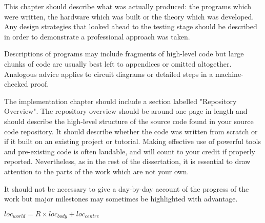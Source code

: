 \documentclass[runningheads]{llncs}
\begin{document}
This chapter should describe what was actually produced: the programs which were written, the hardware which was built or the theory which was developed. Any design strategies that looked ahead to the testing stage should be described in order to demonstrate a professional approach was taken.

Descriptions of programs may include fragments of high-level code but large chunks of code are usually best left to appendices or omitted altogether. Analogous advice applies to circuit diagrams or detailed steps in a machine-checked proof.

The implementation chapter should include a section labelled "Repository Overview". The repository overview should be around one page in length and should describe the high-level structure of the source code found in your source code repository. It should describe whether the code was written from scratch or if it built on an existing project or tutorial. Making effective use of powerful tools and pre-existing code is often laudable, and will count to your credit if properly reported. Nevertheless, as in the rest of the dissertation, it is essential to draw attention to the parts of the work which are not your own. 

It should not be necessary to give a day-by-day account of the progress of the work but major milestones may sometimes be highlighted with advantage.

$loc_{world} = R \times loc_{body} + loc_{centre}$
\end{document}
